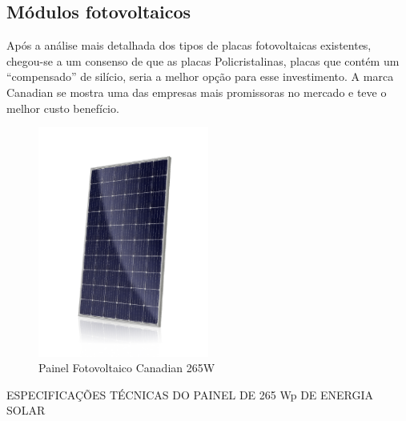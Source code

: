\subsection{Módulos fotovoltaicos}
Após a análise mais detalhada dos tipos de placas fotovoltaicas existentes, chegou-se a um consenso de que as placas Policristalinas, placas que contém um ``compensado'' de silício, seria a melhor opção para esse investimento. A marca Canadian se mostra uma das empresas mais promissoras no mercado e teve o melhor custo benefício.

\begin{figure}[h]
\centering
\includegraphics[width=0.5\textwidth]{figuras/painel1.PNG}
\caption{Painel Fotovoltaico Canadian 265W}
\end{figure}

ESPECIFICAÇÕES TÉCNICAS DO PAINEL DE 265 Wp DE ENERGIA SOLAR


